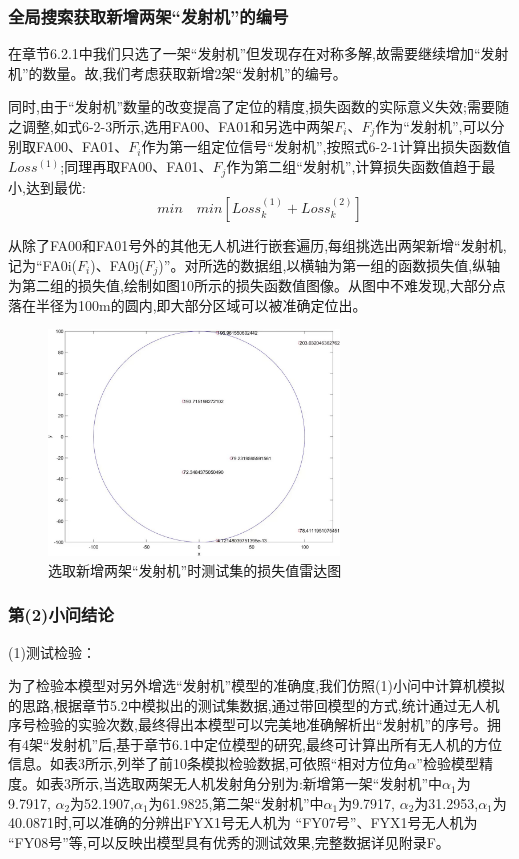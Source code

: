 \documentclass[withoutpreface,bwprint]{cumcmthesis} %
\begin{document}
				\subsubsection{全局搜索获取新增两架“发射机”的编号}
				
				 在章节6.2.1中我们只选了一架“发射机”但发现存在对称多解,故需要继续增加“发射机”的数量。故,我们考虑获取新增2架“发射机”的编号。
				 
				 同时,由于“发射机”数量的改变提高了定位的精度,损失函数的实际意义失效;需要随之调整,如式6-2-3所示,选用FA00、FA01和另选中两架$F_{i}$、$F_{j}$作为“发射机”,可以分别取FA00、FA01、$F_{i}$作为第一组定位信号“发射机”,按照式6-2-1计算出损失函数值$Loss^{(1)}$;同理再取FA00、FA01、$F_{j}$作为第二组“发射机”,计算损失函数值趋于最小,达到最优:
				 	\begin{equation}
				 	\tag{6-2-3}
				 	min \quad min[Loss^{(1)}_{k} + Loss^{(2)}_{k}]  
				 \end{equation}
				 
				从除了FA00和FA01号外的其他无人机进行嵌套遍历,每组挑选出两架新增“发射机,记为“FA0i($F_{i}$)、FA0j($F_{j}$)”。对所选的数据组,以横轴为第一组的函数损失值,纵轴为第二组的损失值,绘制如图10所示的损失函数值图像。从图中不难发现,大部分点落在半径为100m的圆内,即大部分区域可以被准确定位出。
				
				\begin{figure}[htbp!]
					\centering
					\includegraphics[height=6cm]{./figures/6-9.jpg}
					\caption{选取新增两架“发射机”时测试集的损失值雷达图}\label{fig:13}
				\end{figure}
				
				\subsubsection{第(2)小问结论}
				
					(1)测试检验：
					
						为了检验本模型对另外增选“发射机”模型的准确度,我们仿照(1)小问中计算机模拟的思路,根据章节5.2中模拟出的测试集数据,通过带回模型的方式,统计通过无人机序号检验的实验次数,最终得出本模型可以完美地准确解析出“发射机”的序号。拥有4架“发射机”后,基于章节6.1中定位模型的研究,最终可计算出所有无人机的方位信息。如表3所示,列举了前10条模拟检验数据,可依照“相对方位角$\alpha$”检验模型精度。如表3所示,当选取两架无人机发射角分别为:新增第一架“发射机”中$\alpha_{1}$为9.7917,	$\alpha_{2}$为52.1907,$\alpha_{1}$为61.9825,第二架“发射机”中$\alpha_{1}$为9.7917,	$\alpha_{2}$为31.2953,$\alpha_{1}$为40.0871时,可以准确的分辨出FYX1号无人机为 “FY07号”、FYX1号无人机为 “FY08号”等,可以反映出模型具有优秀的测试效果,完整数据详见附录F。
					
\end{document}
